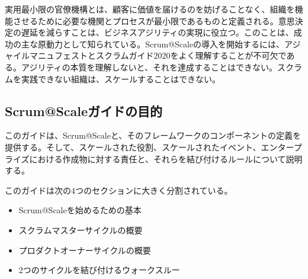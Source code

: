 \documentclass[12pt,a4paper,parskip=full]{scrartcl}
\begin{document}

実用最小限の官僚機構とは、顧客に価値を届けるのを妨げることなく、組織を機能させるために必要な機関とプロセスが最小限であるものと定義される。意思決定の遅延を減らすことは、ビジネスアジリティの実現に役立つ。このことは、成功の主な原動力として知られている。Scrum@Scaleの導入を開始するには、アジャイルマニュフェストとスクラムガイド2020をよく理解することが不可欠である。アジリティの本質を理解しないと、それを達成することはできない。スクラムを実践できない組織は、スケールすることはできない。

\subsection{Scrum@Scaleガイドの目的}\label{purpose-of-the-ScrumatScale-guide}

このガイドは、Scrum@Scaleと、そのフレームワークのコンポーネントの定義を提供する。そして、スケールされた役割、スケールされたイベント、エンタープライズにおける作成物に対する責任と、それらを結び付けるルールについて説明する。

このガイドは次の4つのセクションに大きく分割されている。

\begin{itemize}
\itemsep1pt\parskip0pt

\item
Scrum@Scaleを始めるための基本
\item
スクラムマスターサイクルの概要
\item
プロダクトオーナーサイクルの概要
\item
2つのサイクルを結び付けるウォークスルー
\end{itemize}
\end{document}
